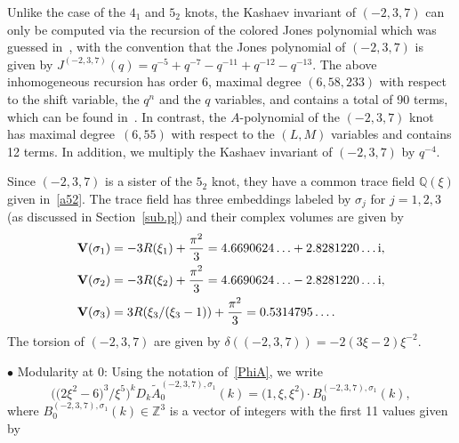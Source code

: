 \documentclass[pdftex]{sigma}
\numberwithin{equation}{section}
\def\BZ{\mathbb Z}
\def\BQ{\mathbb Q}
\def\wt{\widetilde}
\def\s{\sigma}
\def\V{\mathbf V}
\def\tiA{\wt A}
\begin{document}
Unlike the case of the $4_1$ and $5_2$ knots, the Kashaev invariant of
$(-2,3,7)$ can only be computed via the recursion of the colored Jones
polynomial which was guessed in~\cite{GK}, with the convention that the
Jones polynomial of $(-2,3,7)$ is given by
$J^{(-2,3,7)}(q)=q^{-5} + q^{-7} - q^{-11} + q^{-12} - q^{-13}$. The above
inhomogeneous recursion has order 6, maximal degree $(6, 58, 233)$
with respect to the shift variable, the $q^n$ and the $q$ variables,
and contains a total of
90 terms, which can be found in~\cite{Ga:pretzeldata}.
In contrast, the $A$-polynomial of the $(-2,3,7)$ knot has maximal degree~$(6,55)$ with respect to the $(L,M)$ variables and contains 12 terms.
In addition, we multiply the Kashaev invariant of $(-2,3,7)$ by $q^{-4}$.

Since $(-2,3,7)$ is a sister of the $5_2$ knot, they have a common
trace field $\BQ(\xi)$ given in~\eqref{a52}.
The trace field has three embeddings labeled by $\s_j$ for $j=1,2,3$
(as discussed in Section~\ref{sub.p}) and their complex volumes are given
by
\begin{align*}
 \V(\s_1) &= -3 R(\xi_1) + \frac{\pi^2}{3} = 4.6690624 \ldots + 2.8281220 \ldots {\rm i},
 \\
 \V(\s_2) &= -3 R(\xi_2) + \frac{\pi^2}{3} = 4.6690624 \ldots - 2.8281220 \ldots {\rm i},
 \\
 \V(\s_3) &= 3 R(\xi_3/(\xi_3-1)) + \frac{\pi^2}{3} = 0.5314795 \ldots.
\end{align*}
The torsion of $(-2,3,7)$ are given by
$\delta((-2,3,7)) = -2 (3\xi-2) \xi^{-2}$.

$\bullet$ Modularity at 0: Using the notation of~\eqref{PhiA}, we write
\[
\big(\big(2 \xi^2 - 6\big)^3/\xi^5\big)^k  D_k  \tiA^{(-2,3,7),\s_1}_{0}(k) = \big(1,\xi,\xi^2\big)\cdot B^{(-2,3,7),\s_1}_{0}(k),
\]
where $B^{(-2,3,7),\s_1}_{0}(k) \in \BZ^3$ is a vector of integers with the first
11 values given by
\end{document}
